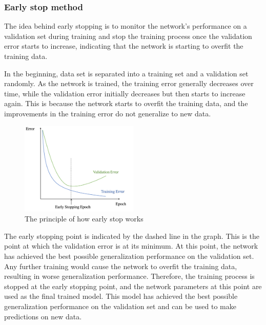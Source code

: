 \documentclass[
	9pt, %
]{beamer}
\begin{document}
\begin{frame}[allowframebreaks]
	\frametitle{Early stop method}
	The idea behind early stopping is to monitor the network's performance on a validation set during training and stop the training process once the validation error starts to increase, indicating that the network is starting to overfit the training data.

In the beginning, data set is separated into a training set and a validation set randomly. As the network is trained, the training error generally decreases over time, while the validation error initially decreases but then starts to increase again. This is because the network starts to overfit the training data, and the improvements in the training error do not generalize to new data.

\begin{figure}[H] %
\centering %
\includegraphics[width=0.5\textwidth]{earlystop.pdf} %
\caption{The principle of how early stop works} %
\end{figure}

The early stopping point is indicated by the dashed line in the graph. This is the point at which the validation error is at its minimum. At this point, the network has achieved the best possible generalization performance on the validation set. Any further training would cause the network to overfit the training data, resulting in worse generalization performance. Therefore, the training process is stopped at the early stopping point, and the network parameters at this point are used as the final trained model. This model has achieved the best possible generalization performance on the validation set and can be used to make predictions on new data.
	

\end{frame}
\end{document}
